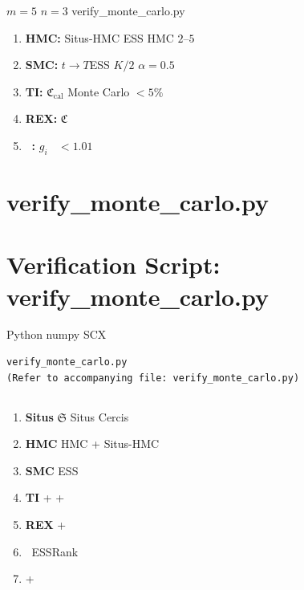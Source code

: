 \documentclass[12pt,a4paper]{article}
\theoremstyle{plain}
\theoremstyle{definition}
\newcommand{\Situs}{\mathfrak{S}}
\newcommand{\Cercis}{\mathfrak{C}}
\DeclareMathOperator{\Rhat}{\hat{R}}
\begin{document}
 $m=5$ $n=3$  verify\_monte\_carlo.py


\textbf{}

\begin{enumerate}[label=(\arabic*)]
    \item \textbf{HMC:} Situs-HMC  ESS  HMC  $2$–$5$ 
        
    \item \textbf{SMC:}  $t \to T$ESS  $K/2$ 
        $\alpha = 0.5$ 
    \item \textbf{TI:} $\Cercis_{\text{cal}}$ Monte Carlo 
         $< 5\%$
    \item \textbf{REX:}  $\Cercis$ 
    \item \textbf{$\Rhat$:}  $g_i$  $\Rhat < 1.01$
\end{enumerate}

\newpage


\appendix
\section{verify\_monte\_carlo.py}
\section*{Verification Script: verify\_monte\_carlo.py}

 Python 
 numpy SCX 

\begin{verbatim}
verify_monte_carlo.py
(Refer to accompanying file: verify_monte_carlo.py)
\end{verbatim}

\subsection{}



\begin{enumerate}[label=\textbf{ \arabic*:}]
    \item \textbf{Situs }  $\Situs$ Situs Cercis 
    \item \textbf{HMC }  HMC + Situs-HMC
    \item \textbf{SMC }  ESS 
    \item \textbf{TI }  +  + 
    \item \textbf{REX }  + 
    \item \textbf{} $\Rhat$ESSRank 
    \item \textbf{}  + 
\end{enumerate}
\end{document}

